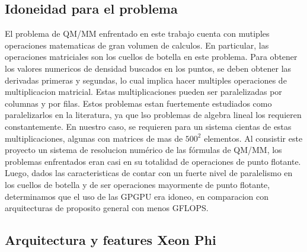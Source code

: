 \subsection{Idoneidad para el problema}
El problema de QM/MM enfrentado en este trabajo cuenta con mutiples operaciones matematicas de gran
volumen de calculos. En particular, las operaciones matriciales son los cuellos de botella en este
problema.
Para obtener los valores numericos de densidad buscados en los puntos, se deben obtener las derivadas primeras
y segundas, lo cual implica hacer multiples operaciones de multiplicacion matricial. Estas multiplicaciones
pueden ser paralelizadas por columnas y por filas. Estos problemas estan fuertemente estudiados como paralelizarlos
en la literatura, ya que lso problemas de algebra lineal los requieren constantemente.
En nuestro caso, se requieren para un sistema cientas de estas multiplicaciones, algunas con matrices de mas de
$500^2$ elementos. Al consistir este proyecto un sistema de resolucion num\'erico de las f\'ormulas de QM/MM,
los problemas enfrentados eran casi en su totalidad de operaciones de punto flotante. Luego, dados las
caracteristicas de contar con un fuerte nivel de paralelismo en los cuellos de botella y de ser operaciones
mayormente de punto flotante, determinamos que el uso de las GPGPU era idoneo, en comparacion con arquitecturas
de proposito general con menos GFLOPS.

\subsection{Arquitectura y features Xeon Phi}


